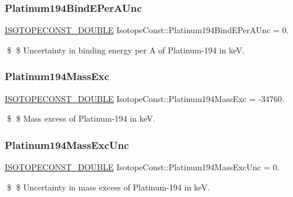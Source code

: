 \subsubsection{\texorpdfstring{Platinum194\+Bind\+E\+Per\+A\+Unc}{Platinum194BindEPerAUnc}}
{\footnotesize\ttfamily \mbox{\hyperlink{group___isotope_const-_macros_ga8f45a7272ce02c0b4c65c44636ed719a}{I\+S\+O\+T\+O\+P\+E\+C\+O\+N\+S\+T\+\_\+\+D\+O\+U\+B\+LE}} Isotope\+Const\+::\+Platinum194\+Bind\+E\+Per\+A\+Unc = 0.}

\$ \$ Uncertainty in binding energy per A of Platinum-\/194 in keV. \mbox{\label{group___isotope_const-_platinum-_pt194_ga51517233e17f589e98ead5b8a8293db3}} 
\subsubsection{\texorpdfstring{Platinum194\+Mass\+Exc}{Platinum194MassExc}}
{\footnotesize\ttfamily \mbox{\hyperlink{group___isotope_const-_macros_ga8f45a7272ce02c0b4c65c44636ed719a}{I\+S\+O\+T\+O\+P\+E\+C\+O\+N\+S\+T\+\_\+\+D\+O\+U\+B\+LE}} Isotope\+Const\+::\+Platinum194\+Mass\+Exc = -\/34760.}

\$ \$ Mass excess of Platinum-\/194 in keV. \mbox{\label{group___isotope_const-_platinum-_pt194_gaf5ce897d79175167cc0a7b7efb2c99ae}} 
\subsubsection{\texorpdfstring{Platinum194\+Mass\+Exc\+Unc}{Platinum194MassExcUnc}}
{\footnotesize\ttfamily \mbox{\hyperlink{group___isotope_const-_macros_ga8f45a7272ce02c0b4c65c44636ed719a}{I\+S\+O\+T\+O\+P\+E\+C\+O\+N\+S\+T\+\_\+\+D\+O\+U\+B\+LE}} Isotope\+Const\+::\+Platinum194\+Mass\+Exc\+Unc = 0.}

\$ \$ Uncertainty in mass excess of Platinum-\/194 in keV. \mbox{\label{group___isotope_const-_platinum-_pt194_ga55488a3f7936ab7f1dc3225ca82c0666}} 

